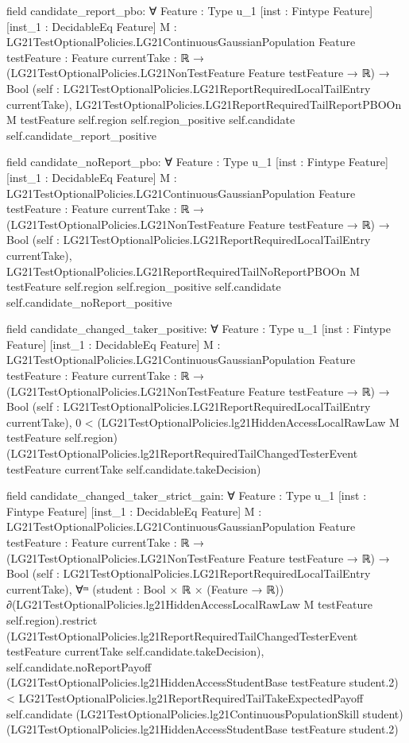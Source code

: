 \documentclass[10pt]{article}
\begin{document}
\begin{ReviewVerbatim}
field candidate_report_pbo:
∀ {Feature : Type u_1} [inst : Fintype Feature] [inst_1 : DecidableEq Feature]
  {M : LG21TestOptionalPolicies.LG21ContinuousGaussianPopulation Feature} {testFeature : Feature}
  {currentTake : ℝ → (LG21TestOptionalPolicies.LG21NonTestFeature Feature testFeature → ℝ) → Bool}
  (self : LG21TestOptionalPolicies.LG21ReportRequiredLocalTailEntry currentTake),
  LG21TestOptionalPolicies.LG21ReportRequiredTailReportPBOOn M testFeature self.region self.region_positive
    self.candidate self.candidate_report_positive

field candidate_noReport_pbo:
∀ {Feature : Type u_1} [inst : Fintype Feature] [inst_1 : DecidableEq Feature]
  {M : LG21TestOptionalPolicies.LG21ContinuousGaussianPopulation Feature} {testFeature : Feature}
  {currentTake : ℝ → (LG21TestOptionalPolicies.LG21NonTestFeature Feature testFeature → ℝ) → Bool}
  (self : LG21TestOptionalPolicies.LG21ReportRequiredLocalTailEntry currentTake),
  LG21TestOptionalPolicies.LG21ReportRequiredTailNoReportPBOOn M testFeature self.region self.region_positive
    self.candidate self.candidate_noReport_positive

field candidate_changed_taker_positive:
∀ {Feature : Type u_1} [inst : Fintype Feature] [inst_1 : DecidableEq Feature]
  {M : LG21TestOptionalPolicies.LG21ContinuousGaussianPopulation Feature} {testFeature : Feature}
  {currentTake : ℝ → (LG21TestOptionalPolicies.LG21NonTestFeature Feature testFeature → ℝ) → Bool}
  (self : LG21TestOptionalPolicies.LG21ReportRequiredLocalTailEntry currentTake),
  0 <
    (LG21TestOptionalPolicies.lg21HiddenAccessLocalRawLaw M testFeature self.region)
      (LG21TestOptionalPolicies.lg21ReportRequiredTailChangedTesterEvent testFeature currentTake
        self.candidate.takeDecision)

field candidate_changed_taker_strict_gain:
∀ {Feature : Type u_1} [inst : Fintype Feature] [inst_1 : DecidableEq Feature]
  {M : LG21TestOptionalPolicies.LG21ContinuousGaussianPopulation Feature} {testFeature : Feature}
  {currentTake : ℝ → (LG21TestOptionalPolicies.LG21NonTestFeature Feature testFeature → ℝ) → Bool}
  (self : LG21TestOptionalPolicies.LG21ReportRequiredLocalTailEntry currentTake),
  ∀ᵐ (student :
    Bool ×
      ℝ ×
        (Feature →
          ℝ)) ∂(LG21TestOptionalPolicies.lg21HiddenAccessLocalRawLaw M testFeature self.region).restrict
      (LG21TestOptionalPolicies.lg21ReportRequiredTailChangedTesterEvent testFeature currentTake
        self.candidate.takeDecision),
    self.candidate.noReportPayoff (LG21TestOptionalPolicies.lg21HiddenAccessStudentBase testFeature student.2) <
      LG21TestOptionalPolicies.lg21ReportRequiredTailTakeExpectedPayoff self.candidate
        (LG21TestOptionalPolicies.lg21ContinuousPopulationSkill student)
        (LG21TestOptionalPolicies.lg21HiddenAccessStudentBase testFeature student.2)
\end{ReviewVerbatim}
\end{document}
